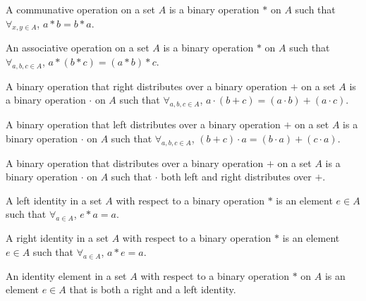 \documentclass[crop=false,class=book]{standalone}
\begin{document}
\begin{definition}
    \label{Definition:MathEnc:Analysis:Sum:CommunativeOperation}
    A communative operation on a set $A$ is a binary operation $*$ on $A$
    such that $\forall_{x,y\in A}$, $a*b=b*a$.
\end{definition}
\begin{definition}
    \label{Definition:MathEnc:Analysis:Sum:AssociativeOperation}
    An associative operation on a set $A$ is a binary operation $*$ on $A$
    such that $\forall_{a,b,c\in A}$, $a*(b*c)=(a*b)*c$.
\end{definition}
\begin{definition}
    \label{Definition:MathEnc:Analysis:Sum:RightDistribute}
    A binary operation that right distributes over a binary operation $+$ on
    a set $A$ is a binary operation $\cdot$ on $A$ such that
    $\forall_{a,b,c\in A}$, $a\cdot (b+c)=(a\cdot b)+(a\cdot c)$.
\end{definition}
\begin{definition}
    \label{Definition:MathEnc:Analysis:Sum:LeftDistribute}
    A binary operation that left distributes over a binary operation $+$ on
    a set $A$ is a binary operation $\cdot$ on $A$ such that
    $\forall_{a,b,c\in A}$, $(b+c)\cdot a=(b\cdot a)+(c\cdot a)$.
\end{definition}
\begin{definition}
    \label{Definition:MathEnc:Analysis:Sum:Distribute}
    A binary operation that distributes over a binary operation $+$ on
    a set $A$ is a binary operation $\cdot$ on $A$ such that
    $\cdot$ both left and right distributes over $+$.
\end{definition}
\begin{definition}
    \label{Definition:MathEnc:Analysis:Sum:LeftIdentity}
    A left identity in a set $A$ with respect to a binary operation $*$ is
    an element $e\in A$ such that $\forall_{a\in A}$, $e*a=a$.
\end{definition}
\begin{definition}
    \label{Definition:MathEnc:Analysis:Sum:RightIdentity}
    A right identity in a set $A$ with respect to a binary operation $*$ is
    an element $e\in A$ such that $\forall_{a\in A}$, $a*e=a$.
\end{definition}
\begin{definition}
    \label{Definition:MathEnc:Analysis:Sum:IdentityElement}
    An identity element in a set $A$ with respect to a binary operation $*$
    on $A$ is an element $e\in A$ that is both a right and a left identity.
\end{definition}
\end{document}
